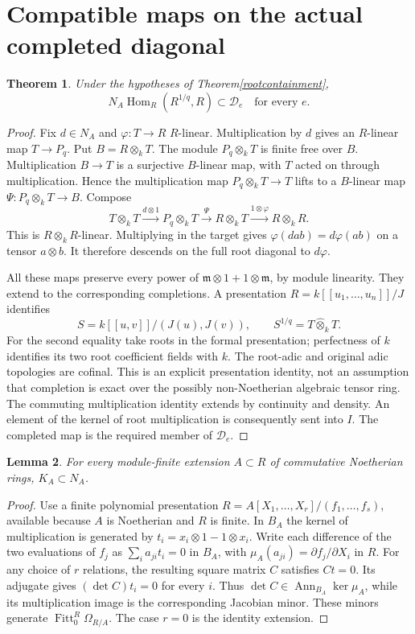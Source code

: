 \documentclass[11pt]{article}
\newtheorem{theorem}{Theorem}
\newtheorem{lemma}[theorem]{Lemma}
\newcommand{\Hom}{\operatorname{Hom}}
\newcommand{\Ann}{\operatorname{Ann}}
\newcommand{\Fitt}{\operatorname{Fitt}}
\newcommand{\wtensor}{\mathbin{\widehat\otimes}}
\begin{document}
\section{Compatible maps on the actual completed diagonal}
\begin{theorem}\label{lift}
Under the hypotheses of Theorem\ref{rootcontainment},
\[
 N_A\Hom_R(R^{1/q},R)\subset\mathcal D_e
 \quad\text{for every }e.
\]
\end{theorem}
\begin{proof}
Fix $d\in N_A$ and $\varphi:T\to R$ $R$-linear. Multiplication by $d$
gives an $R$-linear map $T\to P_q$. Put $B=R\otimes_k T$.
The module $P_q\otimes_k T$ is finite free over $B$.
Multiplication $B\to T$ is a surjective $B$-linear map, with $T$ acted on
through multiplication. Hence the multiplication map
$P_q\otimes_k T\to T$ lifts to a $B$-linear map
$\Psi:P_q\otimes_k T\to B$.
Compose
\[
 T\otimes_k T\xrightarrow{d\otimes1}P_q\otimes_k T
 \xrightarrow{\Psi}R\otimes_k T
 \xrightarrow{1\otimes\varphi}R\otimes_k R.
\]
This is $R\otimes_k R$-linear. Multiplying in the target gives
$\varphi(dab)=d\varphi(ab)$ on a tensor $a\otimes b$.
It therefore descends on the full root diagonal to $d\varphi$.

All these maps preserve every power of
$\mathfrak m\otimes1+1\otimes\mathfrak m$, by module linearity.
They extend to the corresponding completions. A presentation
$R=k[[u_1,\ldots,u_n]]/J$ identifies
\[
 S=k[[u,v]]/(J(u),J(v)),\qquad
 S^{1/q}=T\wtensor_k T.
\]
For the second equality take roots in the formal presentation; perfectness
of $k$ identifies its two root coefficient fields with $k$.
The root-adic and original adic topologies are cofinal. This is an explicit
presentation identity, not an assumption that completion is exact over the
possibly non-Noetherian algebraic tensor ring.
The commuting multiplication identity extends by continuity and density.
An element of the kernel of root multiplication is consequently sent into
$I$. The completed map is the required member of $\mathcal D_e$.
\end{proof}

\begin{lemma}\label{kahler}
For every module-finite extension $A\subset R$ of commutative Noetherian rings,
$K_A\subset N_A$.
\end{lemma}
\begin{proof}
Use a finite polynomial presentation
$R=A[X_1,\ldots,X_r]/(f_1,\ldots,f_s)$, available because $A$ is
Noetherian and $R$ is finite. In $B_A$ the kernel of multiplication is
generated by $t_i=x_i\otimes1-1\otimes x_i$.
Write each difference of the two evaluations of $f_j$ as
$\sum_i a_{ji}t_i=0$ in $B_A$, with
$\mu_A(a_{ji})=\partial f_j/\partial X_i$ in $R$.
For any choice of $r$ relations, the resulting square matrix $C$ satisfies
$Ct=0$. Its adjugate gives $(\det C)t_i=0$ for every $i$.
Thus $\det C\in\Ann_{B_A}\ker\mu_A$, while its multiplication image is
the corresponding Jacobian minor. These minors generate
$\Fitt_0^R\Omega_{R/A}$. The case $r=0$ is the identity extension.
\end{proof}
\end{document}
